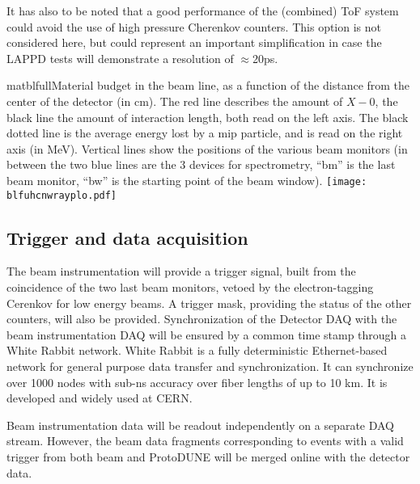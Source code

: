 It has also to be noted that a good performance of the (combined) ToF system could avoid the use of high pressure  Cherenkov counters. This option is not considered here, but could
represent an important simplification  in case the LAPPD tests will demonstrate a resolution of $\approx$20ps.
 \begin{cdrfigure}{matblfull}{Material budget in the beam line, as a function of the distance from the center of the detector (in cm). The red line describes the amount of $X-0$, the black line the amount of interaction length, both read on the left axis. The black dotted line is the average energy lost by a mip particle, and is read on the right axis (in MeV). Vertical lines show the positions of the various beam monitors (in between the two blue lines are the 3 devices for spectrometry, ``bm'' is the last beam monitor, ``bw'' is the starting point of the beam window).}  
\texttt{[image: blfuhcnwrayplo.pdf]}
\end{cdrfigure}
%



\subsection {Trigger and data acquisition}
The beam instrumentation will provide a trigger signal, built from the coincidence of the two last beam monitors, vetoed by the electron-tagging Cerenkov for low energy beams. A trigger mask, providing the status of the other counters, will also be provided. 
 Synchronization of the Detector DAQ with the beam instrumentation DAQ will be ensured by a common time stamp through a White Rabbit network.
 White Rabbit is a fully deterministic Ethernet-based network for general purpose data transfer and synchronization. It can synchronize over 1000 nodes with sub-ns accuracy over fiber lengths of up to 10 km. It is developed and widely used at CERN.

Beam instrumentation data will be readout independently on a separate DAQ stream. However,  
the beam data fragments corresponding to  events with a valid trigger from both beam and ProtoDUNE will be merged online with the detector data.
 
